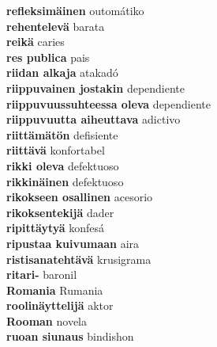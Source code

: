\textbf{ refleksimäinen  } outomátiko \\
\textbf{ rehentelevä  } barata \\
\textbf{ reikä  } caries \\
\textbf{ res publica  } pais \\
\textbf{ riidan alkaja  } atakadó \\
\textbf{ riippuvainen jostakin  } dependiente \\
\textbf{ riippuvuussuhteessa oleva  } dependiente \\
\textbf{ riippuvuutta aiheuttava  } adictivo \\
\textbf{ riittämätön  } defisiente \\
\textbf{ riittävä  } konfortabel \\
\textbf{ rikki oleva  } defektuoso \\
\textbf{ rikkinäinen  } defektuoso \\
\textbf{ rikokseen osallinen  } acesorio \\
\textbf{ rikoksentekijä  } dader \\
\textbf{ ripittäytyä  } konfesá \\
\textbf{ ripustaa kuivumaan  } aira \\
\textbf{ ristisanatehtävä  } krusigrama \\
\textbf{ ritari-  } baronil \\
\textbf{ Romania  } Rumania \\
\textbf{ roolinäyttelijä  } aktor \\
\textbf{ Rooman  } novela \\
\textbf{ ruoan siunaus  } bindishon \\
